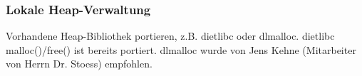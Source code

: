 \subsubsection{Lokale Heap-Verwaltung}

Vorhandene Heap-Bibliothek portieren, z.B. dietlibc oder dlmalloc. dietlibc malloc()/free() ist bereits portiert. dlmalloc wurde von Jens Kehne (Mitarbeiter von Herrn Dr. Stoess) empfohlen.

